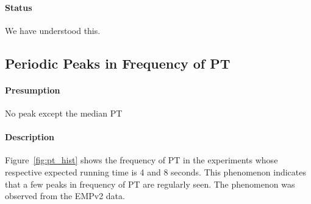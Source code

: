 \documentclass[10pt]{article}
\begin{document}
\paragraph{Status} We have understood this.

\newpage

\subsection{Periodic Peaks in Frequency of PT}
 
\paragraph{Presumption} No peak except the median PT

\paragraph{Description} 
Figure~\ref{fig:pt_hist} shows the frequency of PT in the experiments 
whose respective expected running time is 4 and 8 seconds. 
This phenomenon indicates that a few peaks in frequency of PT are regularly seen. 
The phenomenon was observed from the EMPv2 data.
\end{document}
